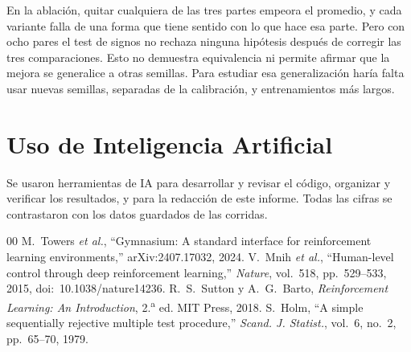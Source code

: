 \documentclass[conference]{IEEEtran}
\begin{document}
En la ablación, quitar cualquiera de las tres partes empeora el promedio, y cada variante falla de una forma que tiene sentido con lo que hace esa parte. Pero con ocho pares el test de signos no rechaza ninguna hipótesis después de corregir las tres comparaciones. Esto no demuestra equivalencia ni permite afirmar que la mejora se generalice a otras semillas. Para estudiar esa generalización haría falta usar nuevas semillas, separadas de la calibración, y entrenamientos más largos.

\section*{Uso de Inteligencia Artificial}
Se usaron herramientas de IA para desarrollar y revisar el código, organizar y verificar los resultados, y para la redacción de este informe. Todas las cifras se contrastaron con los datos guardados de las corridas.

\begin{thebibliography}{00}
 M.~Towers \textit{et al.}, ``Gymnasium: A standard interface for reinforcement learning environments,'' arXiv:2407.17032, 2024.
 V.~Mnih \textit{et al.}, ``Human-level control through deep reinforcement learning,'' \textit{Nature}, vol.~518, pp.~529--533, 2015, doi:~10.1038/nature14236.
 R.~S.~Sutton y A.~G.~Barto, \textit{Reinforcement Learning: An Introduction}, 2.\textsuperscript{a} ed. MIT Press, 2018.
 S.~Holm, ``A simple sequentially rejective multiple test procedure,'' \textit{Scand. J. Statist.}, vol.~6, no.~2, pp.~65--70, 1979.
\end{thebibliography}
\end{document}
